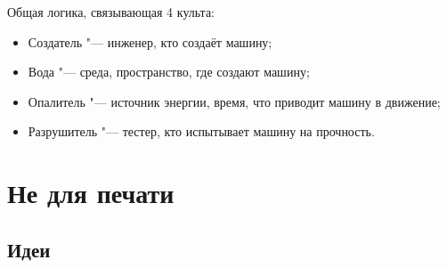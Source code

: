 \documentclass[a4paper,10pt,fleqn]{book}
\begin{document}
Общая логика, связывающая 4 культа:

\begin{itemize}
\item Создатель "--- инженер, кто создаёт машину;
\item Вода "--- среда, пространство, где создают машину;
\item Опалитель "--- источник энергии, время, что приводит машину в движение;
\item Разрушитель "--- тестер, кто испытывает машину на прочность.
\end{itemize}


\chapter{Не для печати}

\section{Идеи}
\end{document}
